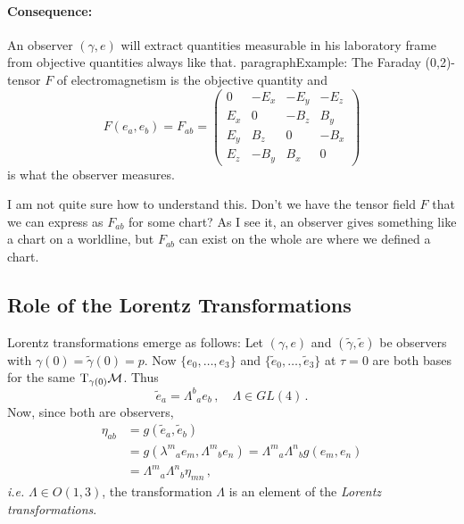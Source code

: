 \documentclass[11pt, a4paper, twocolumn]{article} %
\begin{document}
    \paragraph{Consequence:}
    An observer $(\gamma, e)$ will extract quantities measurable in his laboratory frame
    from objective quantities always like that.
    paragraph{Example:}
    The Faraday (0,2)-tensor $F$ of electromagnetism is the objective quantity and
    \begin{equation}
        F(e_a, e_b) = F_{ab} = 
        \begin{pmatrix}
            0     & -E_x & -E_y & -E_z \\
            E_x &  0     & -B_z   &  B_y    \\
            E_y &  B_z   &  0     & -B_x   \\
            E_z & -B_y   &  B_x   &  0
        \end{pmatrix}
    \end{equation}
    is what the observer measures.
    \begin{note}
        I am not quite sure how to understand this.
        Don't we have the tensor field $F$ that we can express as $F_{ab}$ for some
        chart?
        As I see it, an observer gives something like a chart on a worldline, but
        $F_{ab}$ can exist on the whole are where we defined a chart.
    \end{note}

    \subsection{Role of the Lorentz Transformations}
    Lorentz transformations emerge as follows:
    Let $(\gamma, e)$ and $(\tilde{\gamma}, \tilde{e})$ be observers with
    $\gamma(0) = \tilde{\gamma}(0) = p$.
    Now $\{e_0, \dots, e_3\}$ and $\{\tilde{e}_0, \dots, \tilde{e}_3\}$ at $\tau=0$
    are both bases for the same $\T_{\gamma(0)}\M$.
    Thus
    \begin{equation}
        \tilde{e}_a = \Lambda^b{}_a e_b\,,\quad \Lambda \in GL(4)\,.
    \end{equation}
    Now, since both are observers,
    \begin{align}
        \eta_{ab} &= g(\tilde{e}_a, \tilde{e}_b)\\
        &= g\left( \lambda^m{}_a e_m, \Lambda^m{}_b e_n \right) =
        \Lambda^m{}_a \Lambda^n{}_b g(e_m, e_n) \\
        &= \Lambda^m{}_a \Lambda^n{}_b \eta_{mn}\,,
    \end{align}
    \textit{i.e.} $\Lambda \in O(1,3)$, the transformation $\Lambda$ is an element
    of the \textit{Lorentz transformations}.
\end{document}
